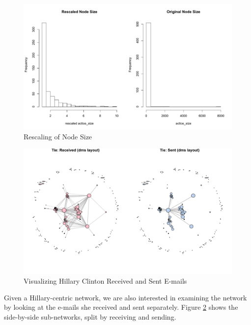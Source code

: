 \begin{figure}[ht]
\centering
\includegraphics[width=.9\textwidth]{zoe/report_rescaled_size}
\caption{Rescaling of Node Size}
\label{fig:rescalenode}
\end{figure}

\begin{figure}[ht]
\centering
\includegraphics[width=.9\textwidth]{zoe/report_network_compare}
\caption{Visualizing Hillary Clinton Received and Sent E-mails}
\label{fig:splitnw}
\end{figure}

Given a Hillary-centric network, we are also interested in examining the network by looking at the e-mails she received and sent separately. Figure \ref{fig:splitnw} shows the side-by-side sub-networks, split by receiving and sending.
